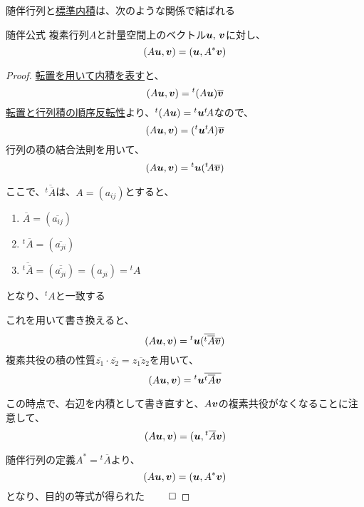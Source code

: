 \documentclass[../../../topic_linear-algebra]{subfiles}
\begin{document}
随伴行列と\hyperref[def:standard-inner-product-Cn]{標準内積}は、次のような関係で結ばれる

\begin{theorem}{随伴公式}\label{thm:adjoint-identity}
  複素行列$A$と計量空間上のベクトル$\vb*{u},\,\vb*{v}$に対し、
  \begin{equation*}
    (A\vb*{u}, \vb*{v}) = (\vb*{u}, A^*\vb*{v})
  \end{equation*}
\end{theorem}

\begin{proof}
  \hyperref[thm:inner-product-as-transpose-product]{転置を用いて内積を表す}と、
  \begin{equation*}
    (A\vb*{u},\vb*{v}) = {}^t(A\vb*{u}) \overline{\vb*{v}}
  \end{equation*}
  \hyperref[thm:transpose-of-product]{転置と行列積の順序反転性}より、${}^t(A\vb*{u}) = {}^t\vb*{u} {}^t\! A$なので、
  \begin{equation*}
    (A\vb*{u},\vb*{v}) = ({}^t\vb*{u} {}^t\! A) \overline{\vb*{v}}
  \end{equation*}
  行列の積の結合法則を用いて、
  \begin{equation*}
    (A\vb*{u},\vb*{v}) = {}^t\vb*{u} ({}^t\! A\overline{\vb*{v}})
  \end{equation*}

  ここで、$\overline{{}^t \overline{A}}$は、$A=(a_{ij})$とすると、
  \begin{enumerate}
    \item $\overline{A} = (\overline{a_{ij}})$
    \item ${}^t\overline{A} = (\overline{a_{ji}})$
    \item $\overline{{}^t\overline{A}} = (\overline{\overline{a_{ji}}}) = (a_{ji}) = {}^t A$
  \end{enumerate}
  となり、${}^t A$と一致する

  これを用いて書き換えると、
  \begin{equation*}
    (A\vb*{u},\vb*{v}) = {}^t\vb*{u} (\overline{{}^t \overline{A}} \overline{\vb*{v}})
  \end{equation*}
  複素共役の積の性質$\overline{z_1} \cdot \overline{z_2} = \overline{z_1 z_2}$を用いて、
  \begin{equation*}
    (A\vb*{u},\vb*{v}) = {}^t\vb*{u} \overline{{}^t \overline{A} \vb*{v}}
  \end{equation*}

  この時点で、右辺を内積として書き直すと、$A\vb*{v}$の複素共役がなくなることに注意して、
  \begin{equation*}
    (A\vb*{u},\vb*{v}) = (\vb*{u}, {}^t \overline{A} \vb*{v})
  \end{equation*}

  随伴行列の定義$A^* = {}^t \overline{A}$より、
  \begin{equation*}
    (A\vb*{u},\vb*{v}) = (\vb*{u}, A^* \vb*{v})
  \end{equation*}
  となり、目的の等式が得られた $\qed$
\end{proof}
\end{document}
